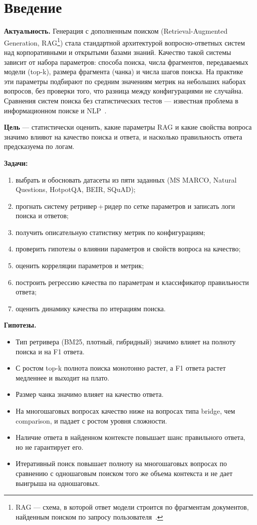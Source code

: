 \section{Введение}

\textbf{Актуальность.} Генерация с дополненным поиском (Retrieval-Augmented Generation, RAG\footnote{RAG --- схема, в которой ответ модели строится по фрагментам документов, найденным поиском по запросу пользователя~\cite{lewis2020}.}) стала стандартной архитектурой вопросно-ответных систем над корпоративными и открытыми базами знаний. Качество такой системы зависит от набора параметров: способа поиска, числа фрагментов, передаваемых модели (top-k), размера фрагмента (чанка) и числа шагов поиска. На практике эти параметры подбирают по средним значениям метрик на небольших наборах вопросов, без проверки того, что разница между конфигурациями не случайна. Сравнения систем поиска без статистических тестов --- известная проблема в информационном поиске и NLP~\cite{smucker2007,dror2018}.

\textbf{Цель} --- статистически оценить, какие параметры RAG и какие свойства вопроса значимо влияют на качество поиска и ответа, и насколько правильность ответа предсказуема по логам.

\textbf{Задачи:}
\begin{enumerate}
\item выбрать и обосновать датасеты из пяти заданных (MS MARCO, Natural Questions, HotpotQA, BEIR, SQuAD);
\item прогнать систему ретривер\,+\,ридер по сетке параметров и записать логи поиска и ответов;
\item получить описательную статистику метрик по конфигурациям;
\item проверить гипотезы о влиянии параметров и свойств вопроса на качество;
\item оценить корреляции параметров и метрик;
\item построить регрессию качества по параметрам и классификатор правильности ответа;
\item оценить динамику качества по итерациям поиска.
\end{enumerate}

\textbf{Гипотезы.}
\begin{itemize}
\item[H1.] Тип ретривера (BM25, плотный, гибридный) значимо влияет на полноту поиска и на F1 ответа.
\item[H2.] С ростом top-k полнота поиска монотонно растет, а F1 ответа растет медленнее и выходит на плато.
\item[H3.] Размер чанка значимо влияет на качество ответа.
\item[H4.] На многошаговых вопросах качество ниже на вопросах типа bridge, чем comparison, и падает с ростом уровня сложности.
\item[H5.] Наличие ответа в найденном контексте повышает шанс правильного ответа, но не гарантирует его.
\item[H6.] Итеративный поиск повышает полноту на многошаговых вопросах по сравнению с одношаговым поиском того же объема контекста и не дает выигрыша на одношаговых.
\end{itemize}

